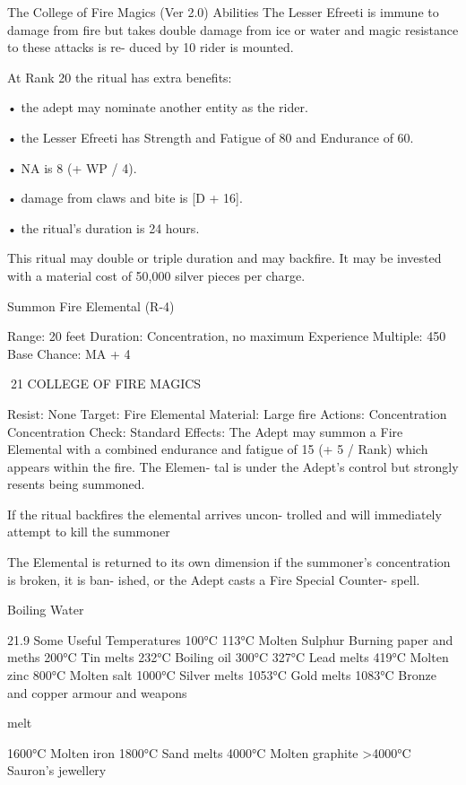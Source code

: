 \begin{Chapter}{The College of Fire Magics (Ver 2.0)}
Abilities  The  Lesser  Efreeti  is immune  to  damage 
from  fire  but  takes  double  damage  from  ice  or 
water  and  magic  resistance  to  these  attacks  is  re-
duced  by  10%
rider is mounted. 

At Rank 20 the ritual has extra benefits:  

•  the  adept  may  nominate  another  entity  as  the 
rider.  

• the Lesser Efreeti has Strength and Fatigue of 80 
and Endurance of 60.  

• NA is 8 (+ WP / 4).  

• damage from claws and bite is [D + 16].  

• the ritual’s duration is 24 hours. 

This  ritual  may  double  or  triple  duration  and  may 
backfire. It may be invested with a material cost of 
50,000 silver pieces per charge. 

Summon Fire Elemental (R-4) 

Range: 20 feet 
Duration: Concentration, no maximum 
Experience Multiple: 450 
Base Chance: MA + 4%

21 COLLEGE OF FIRE MAGICS 

Resist: None 
Target: Fire Elemental 
Material: Large fire 
Actions: Concentration 
Concentration Check: Standard 
Effects: The  Adept may summon a Fire Elemental 
with a combined endurance and fatigue of 15 (+ 5 / 
Rank)  which  appears  within  the  fire.  The  Elemen-
tal is under the Adept’s control but strongly resents 
being summoned. 

If  the  ritual backfires  the  elemental  arrives  uncon-
trolled  and  will  immediately  attempt  to  kill  the 
summoner 

The  Elemental  is  returned  to  its  own  dimension  if 
the  summoner’s  concentration is broken,  it  is ban-
ished,  or  the  Adept  casts  a  Fire  Special  Counter-
spell. 

Boiling Water 

21.9 Some Useful Temperatures 
100°C 
113°C  Molten Sulphur 
Burning paper and meths 
200°C 
Tin melts 
232°C 
Boiling oil 
300°C 
327°C 
Lead melts 
419°C  Molten zinc 
800°C  Molten salt 
1000°C  Silver melts 
1053°C  Gold melts 
1083°C  Bronze and copper armour and weapons 

melt 

1600°C  Molten iron 
1800°C  Sand melts 
4000°C  Molten graphite 
>4000°C  Sauron’s jewellery 
 


\end{Chapter}
